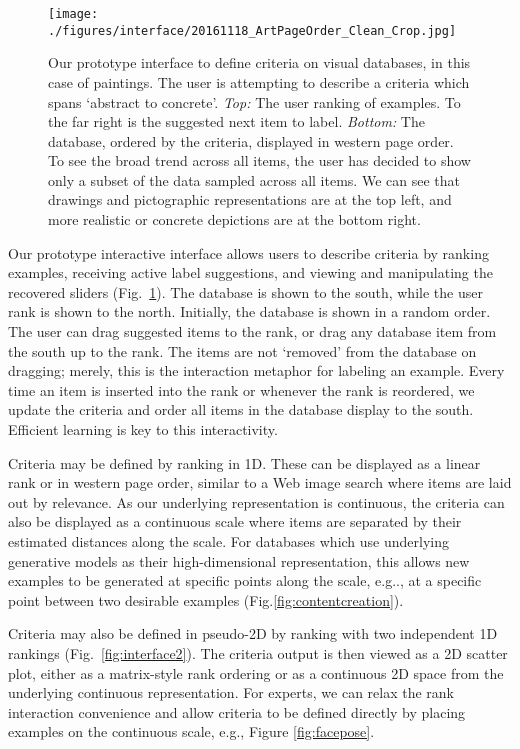 \documentclass{article}
\makeatletter
\DeclareRobustCommand\onedot{\futurelet\@let@token\@onedot}
\def\@onedot{\ifx\@let@token.\else.\null\fi\xspace}
\def\eg{{e.g}\onedot} \def\Eg{{E.g}\onedot}
\makeatother
\begin{document}
\begin{figure}[t]
\centering
\texttt{[image: ./figures/interface/20161118\_ArtPageOrder\_Clean\_Crop.jpg]}
\caption{Our prototype interface to define criteria on visual databases, in this case of paintings. The user is attempting to describe a criteria which spans `abstract to concrete'. \emph{Top:} The user ranking of examples. To the far right is the suggested next item to label. \emph{Bottom:} The database, ordered by the criteria, displayed in western page order. To see the broad trend across all items, the user has decided to show only a subset of the data sampled across all items. We can see that drawings and pictographic representations are at the top left, and more realistic or concrete depictions are at the bottom right.}
\label{fig:interface}
\end{figure}

Our prototype interactive interface allows users to describe criteria by ranking examples, receiving active label suggestions, and viewing and manipulating the recovered sliders (Fig.~\ref{fig:interface}). The database is shown to the south, while the user rank is shown to the north. Initially, the database is shown in a random order. The user can drag suggested items to the rank, or drag any database item from the south up to the rank. The items are not `removed' from the database on dragging; merely, this is the interaction metaphor for labeling an example. Every time an item is inserted into the rank or whenever the rank is reordered, we update the criteria and order all items in the database display to the south. Efficient learning is key to this interactivity.

Criteria may be defined by ranking in 1D. These can be displayed as a linear rank or in western page order, similar to a Web image search where items are laid out by relevance. As our underlying representation is continuous, the criteria can also be displayed as a continuous scale where items are separated by their estimated distances along the scale. For databases which use underlying generative models as their high-dimensional representation, this allows new examples to be generated at specific points along the scale, \eg, at a specific point between two desirable examples (Fig.\ref{fig:contentcreation}).

Criteria may also be defined in pseudo-2D by ranking with two independent 1D rankings (Fig.~\ref{fig:interface2}). The criteria output is then viewed as a 2D scatter plot, either as a matrix-style rank ordering or as a continuous 2D space from the underlying continuous representation. For experts, we can relax the rank interaction convenience and allow criteria to be defined directly by placing examples on the continuous scale, e.g., Figure \ref{fig:facepose}.
\end{document}
